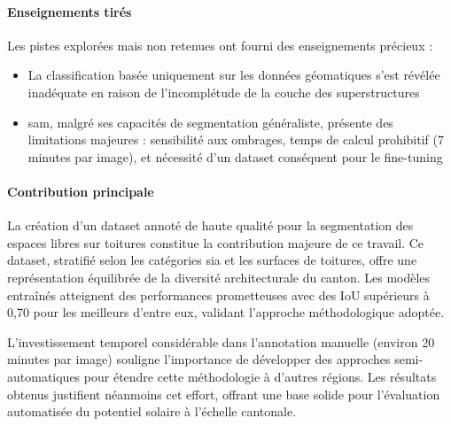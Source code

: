 \paragraph{Enseignements tirés}
Les pistes explorées mais non retenues ont fourni des enseignements précieux :
\begin{itemize}
    \item La classification basée uniquement sur les données géomatiques s'est révélée inadéquate en raison de l'incomplétude de la couche des superstructures
    \item \acrshort{sam}, malgré ses capacités de segmentation généraliste, présente des limitations majeures : sensibilité aux ombrages, temps de calcul prohibitif (7 minutes par image), et nécessité d'un dataset conséquent pour le fine-tuning
\end{itemize}

\paragraph{Contribution principale}
La création d'un dataset annoté de haute qualité pour la segmentation des espaces libres sur toitures constitue la contribution majeure de ce travail. Ce dataset, stratifié selon les catégories \gls{sia} et les surfaces de toitures, offre une représentation équilibrée de la diversité architecturale du canton. Les modèles entraînés atteignent des performances prometteuses avec des IoU supérieurs à 0,70 pour les meilleurs d'entre eux, validant l'approche méthodologique adoptée.

L'investissement temporel considérable dans l'annotation manuelle (environ 20 minutes par image) souligne l'importance de développer des approches semi-automatiques pour étendre cette méthodologie à d'autres régions. Les résultats obtenus justifient néanmoins cet effort, offrant une base solide pour l'évaluation automatisée du potentiel solaire à l'échelle cantonale.